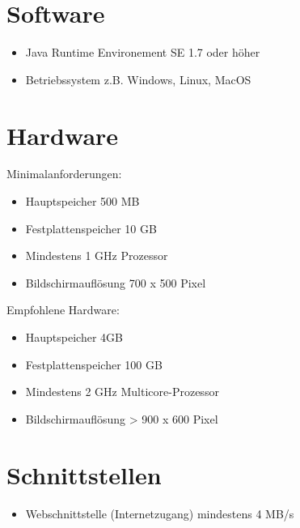 \section{Software}
   \begin{itemize}
      \item Java Runtime Environement SE 1.7 oder höher
      \item Betriebssystem z.B. Windows, Linux, MacOS
   \end{itemize}
\section{Hardware}
	Minimalanforderungen:
   \begin{itemize}
      \item Hauptspeicher 500 MB
      \item Festplattenspeicher 10 GB
      \item Mindestens 1 GHz Prozessor
      \item Bildschirmauflösung 700 x 500 Pixel
   \end{itemize}
   Empfohlene Hardware:
   \begin{itemize}
      \item Hauptspeicher 4GB
      \item Festplattenspeicher 100 GB
      \item Mindestens 2 GHz Multicore-Prozessor
      \item Bildschirmauflösung > 900 x 600 Pixel
   \end{itemize}
\section{Schnittstellen}
   \begin{itemize}
   \item Webschnittstelle (Internetzugang) mindestens 4 MB/s
   \end{itemize}
